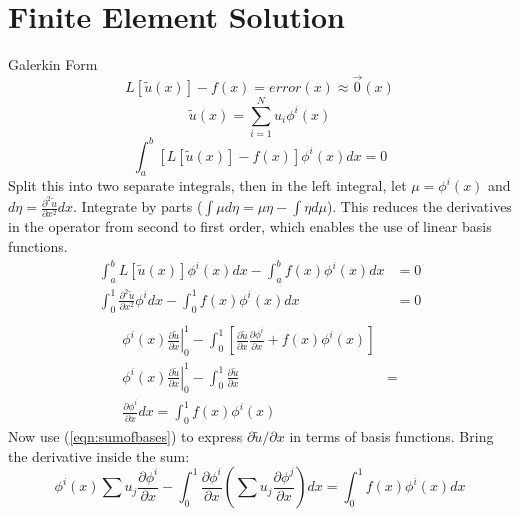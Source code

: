 \documentclass[10pt]{article}
\begin{document}
\section{Finite Element Solution}
\label{sec:FE_work}
Galerkin Form
\begin{equation}
    \label{eqn:galerkin}
    L[\tilde{u}(x)] - f(x) = error(x) \approx \vec{0}(x)
\end{equation}
\begin{equation}
    \label{eqn:sumofbases}
    \tilde{u}(x) = \sum_{i=1}^{N}u_i \phi^i(x)
\end{equation}
\begin{equation}
    \label{eqn:split-integral}
        \int_a^b{\left[ L[\tilde{u}(x)] - f(x) \right] \phi^i(x) dx } = 0
\end{equation}
Split this into two separate integrals, then in the left integral, let $\mu=\phi^i(x)$ and $d\eta=\frac{\partial^2\tilde{u}}{\partial x^2} dx$.
Integrate by parts ($\int \mu d\eta = \mu \eta - \int \eta d\mu$). This reduces the derivatives in the operator from second to first order, which enables the use of linear basis functions.
\begin{equation}
    \begin{split}
        \int_a^b L[\tilde{u}(x)] \phi^i(x) dx - \int_a^b f(x) \phi^i(x) dx &= 0 \\
        \int_0^1{ \frac{\partial^2\tilde{u}}{\partial x^2} \phi^i dx } - \int_0^1 f(x) \phi^i(x) dx &= 0 \\
    \end{split}
\end{equation}
\begin{equation}
    \begin{split}
        \phi^i(x) \left. \frac{\partial \tilde u}{\partial x} \right|_0^1 - \int_0^1 \left[\frac{\partial \tilde u}{\partial x} \frac{\partial \phi^i}{\partial x} + f(x) \phi^i(x)\right] \\
        \phi^i(x) \left. \frac{\partial \tilde u}{\partial x} \right|_0^1 - \int_0^1 \frac{\partial \tilde u}{\partial x} &= \\ \frac{\partial \phi^i}{\partial x} dx = \int_0^1 f(x) \phi^i(x)
    \end{split}
\end{equation}
Now use (\ref{eqn:sumofbases}) to express $\partial \tilde u / \partial x$ in terms of basis functions. Bring the derivative inside the sum:
\begin{equation}
    \phi^i(x) \sum u_j \frac{\partial \phi^i}{\partial x} - \int_0^1 \frac{\partial \phi^i}{\partial x} \left( \sum u_j \frac{\partial \phi^j}{\partial x} \right) dx = \int_0^1 f(x) \phi^i(x) dx
\end{equation}
\end{document}

